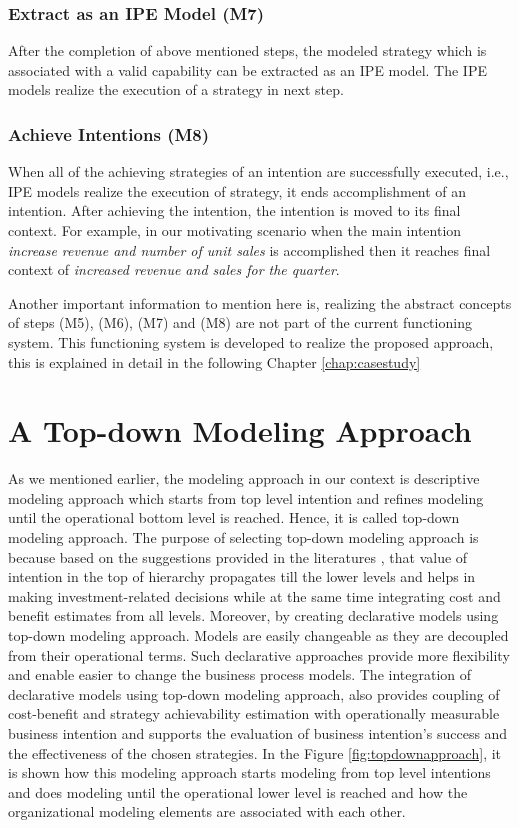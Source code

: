 \subsubsection{Extract as an IPE Model (M7)}  
After the completion of above mentioned steps, the modeled strategy which is associated with a valid capability can be extracted as an IPE model. The IPE models realize the execution of a strategy in next step. 

\subsubsection{Achieve Intentions (M8)}
When all of the achieving strategies of an intention are successfully executed, i.e., IPE models realize the execution of strategy, it ends accomplishment of an intention. After achieving the intention, the intention is moved to its final context. For example, in our motivating scenario when the main intention \textit{increase revenue and number of unit sales} is accomplished then it reaches final context of \textit{increased revenue and sales for the quarter}. 

Another important information to mention here is, realizing the abstract concepts of steps (M5), (M6), (M7) and (M8) are not part of the current functioning system. This functioning system is developed to realize the proposed approach, this is explained in detail in the following Chapter \ref{chap:casestudy}  
 
\section{A Top-down Modeling Approach}
\label{sec:topdownapproach}
As we mentioned earlier, the modeling approach in our context is descriptive modeling approach which starts from top level intention and refines modeling until the operational bottom level is reached. Hence, it is called top-down modeling approach. The purpose of selecting top-down modeling approach is because based on the suggestions provided in the literatures \cite{Mandic2010, Bider2005,Sungur2016}, that value of intention in the top of hierarchy propagates till the lower levels and helps in making investment-related decisions while at the same time integrating cost and benefit estimates from all levels. Moreover, by creating declarative models using top-down modeling approach. Models are easily changeable as they are decoupled from their operational terms. Such declarative approaches provide more flexibility and enable easier to change the business process models. The integration of declarative models using top-down modeling approach, also provides coupling of cost-benefit and strategy achievability estimation with operationally measurable business intention and supports the evaluation of business intention's success and the effectiveness of the chosen strategies. In the Figure \ref{fig:topdownapproach}, it is shown how this modeling approach starts modeling from top level intentions and does modeling until the operational lower level is reached and how the organizational modeling elements are associated with each other. 

